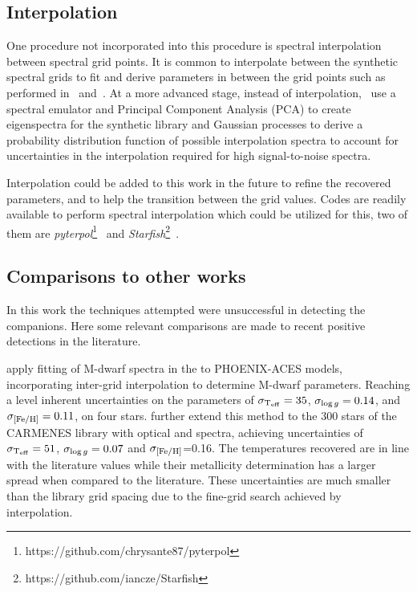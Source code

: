 \subsection{Interpolation}
\label{subsec:interpolation}
One procedure not incorporated into this \textchisquared{} procedure is spectral interpolation between spectral grid points.
It is common to interpolate between the synthetic spectral grids to fit and derive parameters in between the grid points such as performed in~\citet{nemravova_xtauri_2016} and~\citet{passegger_fundamental_2016}.
At a more advanced stage, instead of interpolation,~\citet{czekala_constructing_2015} use a spectral emulator and Principal Component Analysis ({PCA}) to create eigenspectra for the synthetic library and Gaussian processes to derive a probability distribution function of possible interpolation spectra to account for uncertainties in the interpolation required for high signal-to-noise spectra.

Interpolation could be added to this work in the future to refine the recovered parameters, and to help the transition between the grid \Logg{} values.
Codes are readily available to perform spectral interpolation which could be utilized for this, two of them are \emph{pyterpol}\footnote{https://github.com/chrysante87/pyterpol}~\citep{nemravova_xtauri_2016} and \emph{Starfish}\footnote{https://github.com/iancze/Starfish}~\citep{czekala_constructing_2015}.

\subsection{Comparisons to other works}
\label{subsec:chi2_contrast}
In this work the techniques attempted were unsuccessful in detecting the companions.
Here some relevant comparisons are made to recent positive detections in the literature.

\citet{passegger_fundamental_2016} apply \textchisquared{} fitting of {M-dwarf} spectra in the \nir{} to {PHOENIX-ACES} models, incorporating inter-grid interpolation to determine {M-dwarf} parameters.
Reaching a level inherent uncertainties on the parameters of \({\sigma}_{\textrm{T}_{\mathrm{eff}}}= 35\)\K{}, \({\sigma}_{\log{g}{}} = 0.14\), and \({\sigma}_{\feh{}}= 0.11\), on four stars.
\citet{passegger_carmenes_2018} further extend this method to the 300 stars of the {CARMENES} library with optical and \nir{} spectra, achieving uncertainties of \({\sigma}_{\textrm{T}_{\mathrm{eff}}{}}=51\)\K{}, \({\sigma}_{\log{g}{}}=0.07\) and \({\sigma}_{\feh{}}\)=0.16.
The temperatures recovered are in line with the literature values while their metallicity determination has a larger spread when compared to the literature.
These uncertainties are much smaller than the library grid spacing due to the fine-grid search achieved by interpolation.


